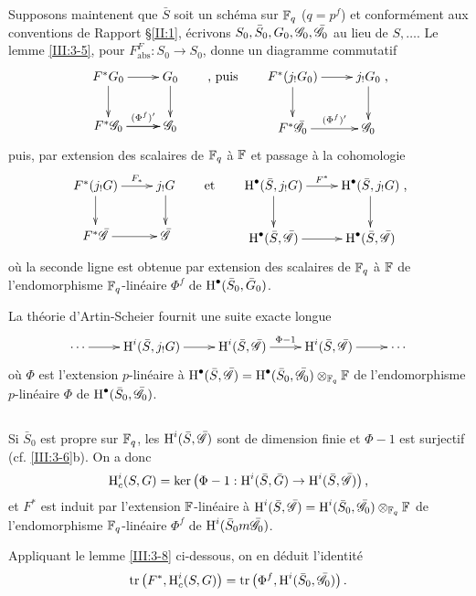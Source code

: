 Supposons maintenent que $\bar S$ soit un schéma sur $\mathbb{F}_q$ ($q=p^f$) et 
conformément aux conventions de Rapport \S\ref{II:1}, écrivons 
$S_0,\bar S_0,G_0,\mathscr{G}_0,\bar{\mathscr{G}}_0$ au lieu de $S,\dots$. Le lemme 
\ref{III:3-5}, pour $F_\text{abs}^F:S_0\to S_0$, donne un diagramme commutatif 
\[\xymatrix{
  F^* G_0 \ar[r] \ar[d] 
    & G_0 \ar[d] \\
  F^*\cG_0 \ar[r]^-{(\Phi^f)'} \ar[r] 
    & \cG_0 
}\qquad\text{, puis}\qquad 
\xymatrix{
  F^*(j_! G_0) \ar[r] \ar[d] 
    & j_!G_0 \ar[d] \\
  F^*\bar\cG_0 \ar[r]^-{(\Phi^f)'}
    & \cG_0
}\text{,}
\]
puis, par extension des scalaires de $\mathbb{F}_q$ à $\mathbb{F}$ et passage à la 
cohomologie 
\[\xymatrix{
  F^*(j_! G) \ar[r]^-{F_*} \ar[d] 
    & j_!G \ar[d] \\
  F^*\bar\cG \ar[r]
    & \bar\cG
}\qquad\text{et}\qquad 
\xymatrix{
  \h^\bullet(\bar S,j_! G) \ar[r]^-{F^*} \ar[d] 
    & \h^\bullet(\bar S,j_!G) \ar[d] \\
  \h^\bullet(\bar S,\bar\cG) \ar[r]
    & \h^\bullet(\bar S,\bar\cG)
}\text{,}
\]
où la seconde ligne est obtenue par extension des scalaires de $\mathbb{F}_q$ à 
$\mathbb{F}$ de l'endomorphisme $\mathbb{F}_q$-linéaire $\Phi^f$ de 
$\operatorname{H}^\bullet(\bar S_0,\bar G_0)$. 

La théorie d'Artin-Scheier fournit une suite exacte longue 
\[\xymatrix{
  \cdots \ar[r]
    & \h^i(\bar S,j_! G) \ar[r]
    & \h^i(\bar S,\bar\cG) \ar[r]^-{\Phi-1}
    & \h^i(\bar S,\bar\cG) \ar[r]
    & \cdots
}\]
où $\Phi$ est l'extension $p$-linéaire à 
$\operatorname{H}^\bullet(\bar S,\bar {\mathscr{G}})= \operatorname{H}^\bullet(\bar S_0,\bar{\mathscr{G}}_0)\otimes_{\mathbb{F}_q}\mathbb{F}$ 
de l'endomorphisme $p$-linéaire $\Phi$ de $\operatorname{H}^\bullet(\bar S_0,\bar{\mathscr{G}}_0)$. 





\subsection{}\label{III:3-7}

Si $\bar S_0$ est propre sur $\mathbb{F}_q$, les $\operatorname{H}^i(\bar S,\bar{\mathscr{G}})$ sont de 
dimension finie et $\Phi-1$ est surjectif (cf. \ref{III:3-6}b). On a donc 
\[
  \operatorname{H}_c^i(S,G) = \ker\left(\Phi-1 : \operatorname{H}^i(\bar S,\bar G) \to \operatorname{H}^i(\bar S,\bar{\mathscr{G}})\right) \text{,}
\]
et $F^*$ est induit par l'extension $\mathbb{F}$-linéaire à 
$\operatorname{H}^i(\bar S,\bar{\mathscr{G}}) = \operatorname{H}^i(\bar S_0,\bar{\mathscr{G}}_0)\otimes_{\mathbb{F}_q}\mathbb{F}$ de 
l'endomorphisme $\mathbb{F}_q$-linéaire $\Phi^f$ de $\operatorname{H}^i(\bar S_0m\bar{\mathscr{G}}_0)$. 

Appliquant le lemme \ref{III:3-8} ci-dessous, on en déduit l'identité 
\begin{equation}\label{III:eq:3-7-1}
  \operatorname{tr}\left(F^*,\operatorname{H}_c^i(S,G)\right) = \operatorname{tr}\left(\Phi^f,\operatorname{H}^i(\bar S_0,\bar{\mathscr{G}}_0)\right) \text{.}
\end{equation}






